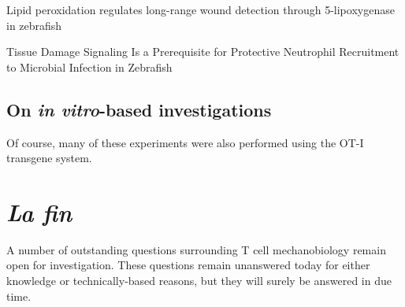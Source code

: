 Lipid peroxidation regulates long-range wound detection through 5-lipoxygenase in zebrafish

Tissue Damage Signaling Is a Prerequisite for Protective Neutrophil Recruitment to Microbial Infection in Zebrafish

\subsection{On \textit{in vitro}-based investigations}

Of course, many of these experiments were also performed using the OT-I transgene system. 

\section{\textit{La fin}}

A number of outstanding questions surrounding T cell mechanobiology remain open for investigation. These questions remain unanswered today for either knowledge or technically-based reasons, but they will surely be answered in due time.
